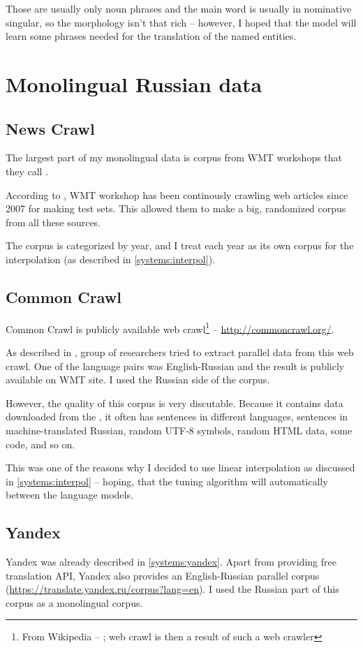 Those are usually only noun phrases and the main word is usually in nominative singular, so the morphology isn't that rich -- however, I hoped that the model will learn some phrases needed for the translation of the named entities.
\section{Monolingual Russian data}
\label{corpora:monolingual}
\subsection{News Crawl}
The largest part of my monolingual data is corpus from WMT workshops that they call .

According to \cite{wmt_findings_2009}, WMT workshop has been continously crawling web articles since 2007 for making test sets. This allowed them to make a big, randomized corpus from all these sources.

The corpus is categorized by year, and I treat each year as its own corpus for the interpolation (as described in \ref{systems:interpol}).%
\subsection{Common Crawl}
Common Crawl is publicly available web crawl\footnote{From Wikipedia -- ; web crawl is then a result of such a web crawler} -- \url{http://commoncrawl.org/}.

As described in \cite{commoncrawl}, group of researchers tried to extract parallel data from this web crawl. One of the language pairs was English-Russian and the result is publicly available on WMT site. I used the Russian side of the corpus.

However, the quality of this corpus is very discutable. Because it contains data downloaded from the , it often has sentences in different languages, sentences in machine-translated Russian, random UTF-8 symbols, random HTML data, some code, and so on.

This was one of the reasons why I decided to use linear interpolation as discussed in 
\ref{systems:interpol} 
-- hoping, that the tuning algorithm will automatically  between the language models.
\subsection{Yandex}
Yandex was already described in 
\ref{systems:yandex}. 
Apart from providing free translation API, Yandex also provides an English-Russian parallel corpus (\url{https://translate.yandex.ru/corpus?lang=en}). I used the Russian part of this corpus as a monolingual corpus.

